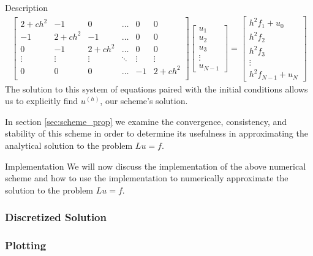 \begin{subsection}{Description}
\begin{align*}
\begin{bmatrix}
      2 + ch^2 & -1 & 0 & \hdots & 0 & 0\\
      -1 & 2 + ch^2 & -1 & \hdots & 0 & 0\\
      0 & -1 & 2 + ch^2 & \hdots & 0 & 0\\
      \vdots & \vdots & \vdots & \ddots & \vdots & \vdots \\
      0 & 0 & 0 & \hdots & -1 & 2+ch^2 \\
    \end{bmatrix}
    \begin{bmatrix}
      u_1 \\
      u_2 \\
      u_3 \\
      \vdots \\
      u_{N-1}
    \end{bmatrix}
    =
    \begin{bmatrix}
      h^2 f_1 + u_0 \\
      h^2 f_2 \\
      h^2 f_3 \\
      \vdots \\
      h^2 f_{N-1} + u_{N}
    \end{bmatrix}
  \end{align*}
  The solution to this system of equations paired with the initial conditions
  allows us to explicitly find $u^{(h)}$, our scheme's solution.

  In section \ref{sec:scheme_prop} we examine the convergence, consistency,
  and stability of this scheme in order to determine its usefulness in
  approximating the analytical solution to the problem $Lu = f$.
\end{subsection}

\begin{subsection}{Implementation}
  We will now discuss the implementation of the above numerical scheme and
  how to use the implementation to numerically approximate the solution to the
  problem $Lu = f$.
  \subsubsection{Discretized Solution}

  \subsubsection{Plotting}

\end{subsection}
